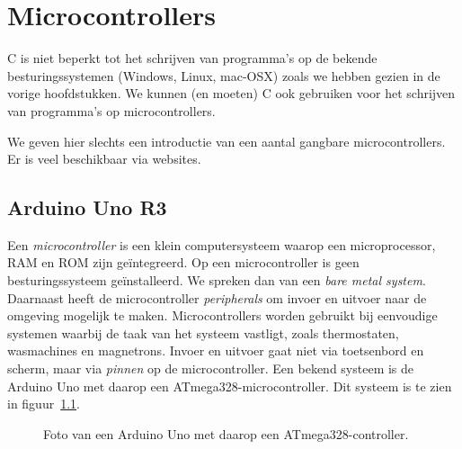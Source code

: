\chapter{Microcontrollers}
\label{cha:microcontrollers}

C is niet beperkt tot het schrijven van programma's op de bekende besturingssystemen (Windows, Linux, mac-OSX) zoals we hebben gezien in de vorige hoofdstukken. We kunnen (en moeten) C ook gebruiken voor het schrijven van programma's op microcontrollers.

We geven hier slechts een introductie van een aantal gangbare microcontrollers. Er is veel beschikbaar via websites.



\section{Arduino Uno R3}
Een \textsl{microcontroller} is een klein computersysteem waarop een microprocessor, RAM en ROM zijn ge\"integreerd. Op een microcontroller is geen besturingssysteem ge\"installeerd. We spreken dan van een \textsl{bare metal system}. Daarnaast heeft de microcontroller \textsl{peripherals} om invoer en uitvoer naar de omgeving mogelijk te maken. Microcontrollers worden gebruikt bij eenvoudige systemen waarbij de taak van het systeem vastligt, zoals thermostaten, wasmachines en magnetrons. Invoer en uitvoer gaat niet via toetsenbord en scherm, maar via \textsl{pinnen} op de microcontroller. Een bekend systeem is de Arduino Uno met daarop een ATmega328-microcontroller. Dit systeem is te zien in figuur~\ref{fig:arduinouno}.

\begin{figure}[!ht]
\centering
{}
\caption{Foto van een Arduino Uno met daarop een ATmega328-controller.}
\label{fig:arduinouno}
\end{figure}

